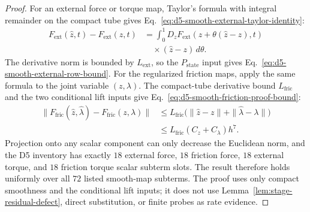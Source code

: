 \documentclass[preprint,12pt]{elsarticle}
\begin{document}
\begin{proof}
For an external force or torque map, Taylor's formula with integral remainder
on the compact tube gives Eq.~\eqref{eq:d5-smooth-external-taylor-identity}:
\begin{equation}
\label{eq:d5-smooth-external-taylor-identity}
\begin{aligned}
  F_{\mathrm{ext}}(\widehat z,t)-F_{\mathrm{ext}}(z,t)
  &=
  \int_0^1 D_zF_{\mathrm{ext}}(z+\theta(\widehat z-z),t)\\
  &\quad{}\times
  (\widehat z-z)\,d\theta .
\end{aligned}
\end{equation}
The derivative norm is bounded by \(L_{\mathrm{ext}}\), so the
\(P_{\mathrm{state}}\) input gives Eq.~\eqref{eq:d5-smooth-external-row-bound}.
For the regularized friction maps, apply the same formula to the joint
variable \((z,\lambda)\).  The compact-tube derivative bound
\(L_{\mathrm{fric}}\) and the two conditional lift inputs give
Eq.~\eqref{eq:d5-smooth-friction-proof-bound}:
\begin{equation}
\label{eq:d5-smooth-friction-proof-bound}
\begin{aligned}
\|F_{\mathrm{fric}}(\widehat z,\widehat\lambda)
        -F_{\mathrm{fric}}(z,\lambda)\|
&\le L_{\mathrm{fric}}\bigl(\|\widehat z-z\|
      +\|\widehat\lambda-\lambda\|\bigr)\\
&\le L_{\mathrm{fric}}(C_z+C_\lambda)h^7 .
\end{aligned}
\end{equation}
Projection onto any scalar component can only decrease the Euclidean norm,
and the D5 inventory has exactly \(18\) external force, \(18\) friction force,
\(18\) external torque, and \(18\) friction torque scalar subterm slots.  The
result therefore holds uniformly over all \(72\) listed smooth-map subterms.
The proof uses only compact smoothness and the conditional lift inputs; it
does not use Lemma~\ref{lem:stage-residual-defect}, direct substitution, or
finite probes as rate evidence.
\end{proof}
\end{document}

